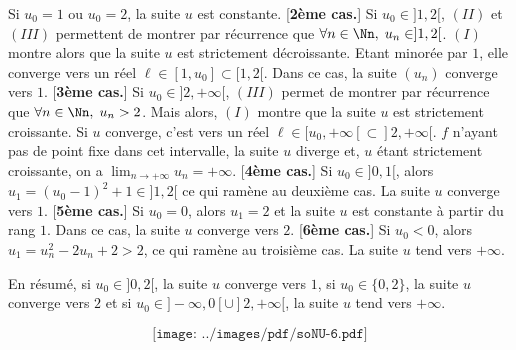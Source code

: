 {{\begin{itemize}
 Si $u_0=1$ ou $u_0=2$, la suite $u$ est constante.
[\textbf{2ème cas.}] Si $u_0\in]1,2[$, $(II)$ et $(III)$ permettent de montrer par récurrence que $\forall n\in\Nn,\;u_n\in]1,2[$. $(I)$ montre alors que la suite $u$ est strictement décroissante. Etant minorée par $1$, elle converge vers un réel $\ell\in[1,u_0]\subset[1,2[$. Dans ce cas, la suite $(u_n)$ converge vers $1$.
[\textbf{3ème cas.}] Si $u_0\in]2,+\infty[$, $(III)$ permet de montrer par récurrence que $\forall n\in\Nn,\;u_n>2$. Mais alors, $(I)$ montre que la suite $u$ est strictement croissante. Si $u$ converge, c'est vers un réel $\ell\in[u_0,+\infty[\subset]2,+\infty[$. $f$ n'ayant pas de point fixe dans cet intervalle, la suite $u$ diverge et, $u$ étant strictement croissante, on a $\lim_{n\rightarrow +\infty}u_n=+\infty$.
[\textbf{4ème cas.}] Si $u_0\in]0,1[$, alors $u_1=(u_0-1)^2+1\in]1,2[$ ce qui ramène au deuxième cas. La suite $u$ converge vers $1$.
[\textbf{5ème cas.}] Si $u_0=0$, alors $u_1=2$ et la suite $u$ est constante à partir du rang $1$. Dans ce cas, la suite $u$ converge vers $2$.
[\textbf{6ème cas.}] Si $u_0<0$, alors $u_1=u_n^2-2u_n+2>2$, ce qui ramène au troisième cas. La suite $u$ tend vers $+\infty$.
\end{itemize}

En résumé, si $u_0\in]0,2[$, la suite $u$ converge vers $1$, si $u_0\in\{0,2\}$, la suite $u$ converge vers $2$ et si $u_0\in]-\infty,0[\cup]2,+\infty[$, la suite $u$ tend vers $+\infty$.

$$\texttt{[image: ../images/pdf/soNU-6.pdf]}$$
}
}
